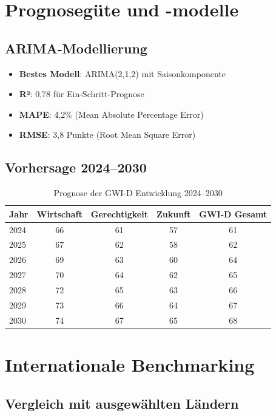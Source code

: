 \section{Prognosegüte und -modelle}

\subsection{ARIMA-Modellierung}

\begin{itemize}
\item \textbf{Bestes Modell}: ARIMA(2,1,2) mit Saisonkomponente
\item \textbf{R²}: 0,78 für Ein-Schritt-Prognose
\item \textbf{MAPE}: 4,2\% (Mean Absolute Percentage Error)
\item \textbf{RMSE}: 3,8 Punkte (Root Mean Square Error)
\end{itemize}

\subsection{Vorhersage 2024--2030}

\begin{table}[ht]
\centering
\begin{tabular}{lcccc}
\toprule
\textbf{Jahr} & \textbf{Wirtschaft} & \textbf{Gerechtigkeit} & \textbf{Zukunft} & \textbf{GWI-D Gesamt} \\
\midrule
2024 & 66 & 61 & 57 & 61 \\
2025 & 67 & 62 & 58 & 62 \\
2026 & 69 & 63 & 60 & 64 \\
2027 & 70 & 64 & 62 & 65 \\
2028 & 72 & 65 & 63 & 66 \\
2029 & 73 & 66 & 64 & 67 \\
2030 & 74 & 67 & 65 & 68 \\
\bottomrule
\end{tabular}
\caption{Prognose der GWI-D Entwicklung 2024--2030}
\label{tab:prognose-2024-2030}
\end{table}

\section{Internationale Benchmarking}

\subsection{Vergleich mit ausgewählten Ländern}

